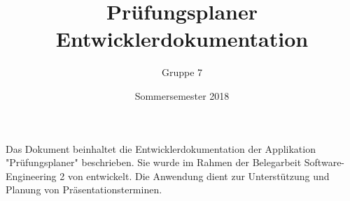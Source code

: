 \documentclass{scrartcl}
\begin{document}
	\title{Prüfungsplaner \\ Entwicklerdokumentation}
	\author{Gruppe 7}
	\date{Sommersemester 2018}
	\maketitle
	
	Das Dokument beinhaltet die Entwicklerdokumentation der Applikation "Prüfungsplaner" beschrieben. Sie wurde im Rahmen der Belegarbeit Software-Engineering 2 von entwickelt. Die Anwendung dient zur Unterstützung und Planung von Präsentationsterminen.
	
	\tableofcontents
	
  
\end{document}
